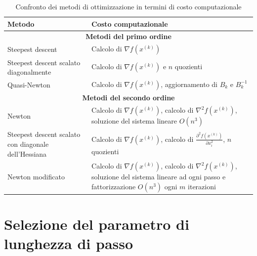\begin{table}[h!]
    \centering
    \begin{tabular}{|l|p{8cm}|}
    \hline
    \textbf{Metodo} & \textbf{Costo computazionale} \\ \hline
    \multicolumn{2}{|c|}{\textbf{Metodi del primo ordine}} \\ \hline
    Steepest descent & Calcolo di $\nabla f(x^{(k)})$ \\ \hline
    Steepest descent scalato diagonalmente & Calcolo di $\nabla f(x^{(k)})$ e $n$ quozienti \\ \hline
    Quasi-Newton & Calcolo di $\nabla f(x^{(k)})$, aggiornamento di $B_k$ e $B_k^{-1}$ \\ \hline
    \multicolumn{2}{|c|}{\textbf{Metodi del secondo ordine}} \\ \hline
    Newton & Calcolo di $\nabla f(x^{(k)})$, calcolo di $\nabla^2 f(x^{(k)})$, soluzione del sistema lineare $O(n^3)$ \\ \hline
    Steepest descent scalato con diagonale dell'Hessiana & Calcolo di $\nabla f(x^{(k)})$, calcolo di $\frac{\partial^2 f(x^{(k)})}{\partial x_i^2}$, $n$ quozienti \\ \hline
    Newton modificato & Calcolo di $\nabla f(x^{(k)})$, calcolo di $\nabla^2 f(x^{(k)})$, soluzione del sistema lineare ad ogni passo e fattorizzazione $O(n^3)$ ogni $m$ iterazioni \\ \hline
    \end{tabular}
    \caption{Confronto dei metodi di ottimizzazione in termini di costo computazionale}
\end{table}
\newpage
\section{Selezione del parametro di lunghezza di passo}

    
    